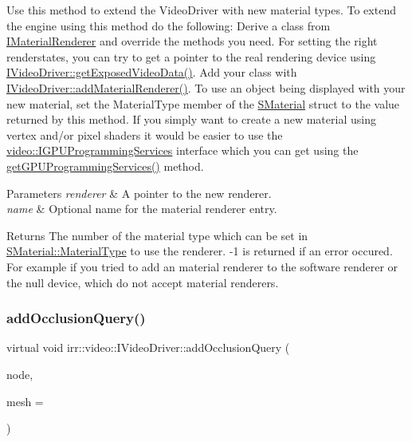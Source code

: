 Use this method to extend the Video\+Driver with new material types. To extend the engine using this method do the following\+: Derive a class from \hyperlink{classirr_1_1video_1_1IMaterialRenderer}{I\+Material\+Renderer} and override the methods you need. For setting the right renderstates, you can try to get a pointer to the real rendering device using \hyperlink{classirr_1_1video_1_1IVideoDriver_a4f3535b2125e654e2e9645745e50cc49}{I\+Video\+Driver\+::get\+Exposed\+Video\+Data()}. Add your class with \hyperlink{classirr_1_1video_1_1IVideoDriver_a0dfc3a7168f3a73a6f4323b579f03ff6}{I\+Video\+Driver\+::add\+Material\+Renderer()}. To use an object being displayed with your new material, set the Material\+Type member of the \hyperlink{classirr_1_1video_1_1SMaterial}{S\+Material} struct to the value returned by this method. If you simply want to create a new material using vertex and/or pixel shaders it would be easier to use the \hyperlink{classirr_1_1video_1_1IGPUProgrammingServices}{video\+::\+I\+G\+P\+U\+Programming\+Services} interface which you can get using the \hyperlink{classirr_1_1video_1_1IVideoDriver_ad2098a408bbe9dad8053c3f4aea7d856}{get\+G\+P\+U\+Programming\+Services()} method. 
\begin{DoxyParams}{Parameters}
{\em renderer} & A pointer to the new renderer. \\
\hline
{\em name} & Optional name for the material renderer entry. \\
\hline
\end{DoxyParams}
\begin{DoxyReturn}{Returns}
The number of the material type which can be set in \hyperlink{classirr_1_1video_1_1SMaterial_a8cb63ab4b49ae1c61fbca8353e6b2f8a}{S\+Material\+::\+Material\+Type} to use the renderer. -\/1 is returned if an error occured. For example if you tried to add an material renderer to the software renderer or the null device, which do not accept material renderers. 
\end{DoxyReturn}
\mbox{\label{classirr_1_1video_1_1IVideoDriver_a07f15814e039772ee43be272e97d1633}} 
\subsubsection{\texorpdfstring{add\+Occlusion\+Query()}{addOcclusionQuery()}}
{\footnotesize\ttfamily virtual void irr\+::video\+::\+I\+Video\+Driver\+::add\+Occlusion\+Query (\begin{DoxyParamCaption}\item[{\hyperlink{classirr_1_1scene_1_1ISceneNode}{scene\+::\+I\+Scene\+Node} $\ast$}]{node,  }\item[{const \hyperlink{classirr_1_1scene_1_1IMesh}{scene\+::\+I\+Mesh} $\ast$}]{mesh = {} }\end{DoxyParamCaption})\hspace{0.3cm}{\ttfamily [pure virtual]}}



